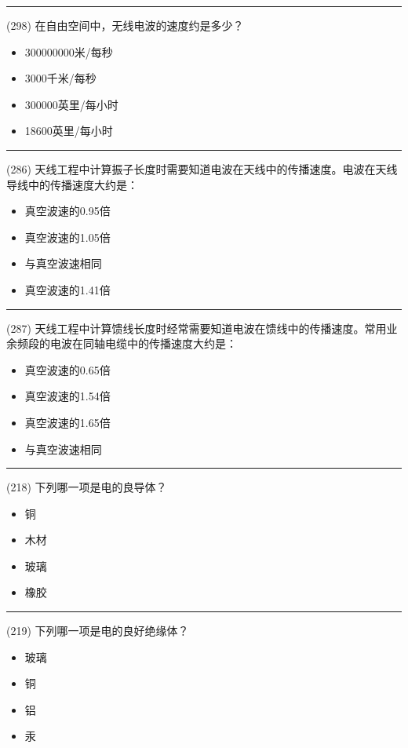 \documentclass[twocolumn,hyperref,UTF8]{ctexart}  %
\begin{document}
\noindent\rule{0.5\textwidth}{1pt}
\heiti (298) 在自由空间中，无线电波的速度约是多少？ \songti {\color{gray} [LK1115] }
\begin{itemize}
	\item  300000000米/每秒
	\item  3000千米/每秒
	\item  300000英里/每小时
	\item  18600英里/每小时
\end{itemize}


\noindent\rule{0.5\textwidth}{1pt}
\heiti (286) 天线工程中计算振子长度时需要知道电波在天线中的传播速度。电波在天线导线中的传播速度大约是： \songti {\color{gray} [LK0973] }
\begin{itemize}
	\item  真空波速的0.95倍
	\item  真空波速的1.05倍
	\item  与真空波速相同
	\item  真空波速的1.41倍
\end{itemize}


\noindent\rule{0.5\textwidth}{1pt}
\heiti (287) 天线工程中计算馈线长度时经常需要知道电波在馈线中的传播速度。常用业余频段的电波在同轴电缆中的传播速度大约是： \songti {\color{gray} [LK0974] }
\begin{itemize}
	\item  真空波速的0.65倍
	\item  真空波速的1.54倍
	\item  真空波速的1.65倍
	\item  与真空波速相同
\end{itemize}


\noindent\rule{0.5\textwidth}{1pt}
\heiti (218) 下列哪一项是电的良导体？ \songti {\color{gray} [LK1138] }
\begin{itemize}
	\item  铜
	\item  木材
	\item  玻璃
	\item  橡胶
\end{itemize}


\noindent\rule{0.5\textwidth}{1pt}
\heiti (219) 下列哪一项是电的良好绝缘体？ \songti {\color{gray} [LK1139] }
\begin{itemize}
	\item  玻璃
	\item  铜
	\item  铝
	\item  汞
\end{itemize}
\end{document}

